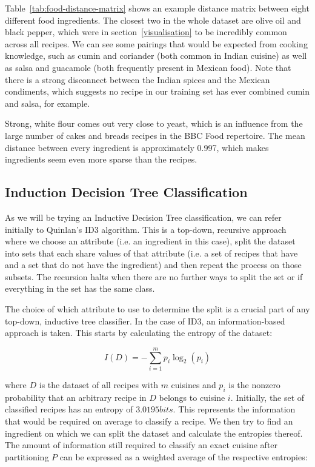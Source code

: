 \documentclass[11pt,a4paper]{article}
\begin{document}
Table~\ref{tab:food-distance-matrix} shows an example distance matrix between eight
different food ingredients. The closest two in the whole dataset are olive oil
and black pepper, which were in section~\ref{visualisation} to be
incredibly common across all recipes.
We can see some pairings that would be expected from cooking knowledge, such as
cumin and coriander (both common in Indian cuisine) as well as salsa and guacamole
(both frequently present in Mexican food). Note that there is a strong disconnect
between the Indian spices and the Mexican condiments, which suggests no recipe
in our training set has ever combined cumin and salsa, for example.

Strong, white flour comes out very close to yeast, which is an influence from the large
number of cakes and breads recipes in the BBC Food repertoire. The mean distance
between every ingredient is approximately 0.997, which makes ingredients seem
even more sparse than the recipes.

\subsection{Induction Decision Tree Classification}
\label{sec:idt-classification}

As we will be trying an Inductive Decision Tree classification, we can refer
initially to Quinlan's ID3 algorithm. \cite{quinlan1986induction} This is a top-down,
recursive approach where we choose an attribute (i.e. an ingredient in this case),
split the dataset into sets that each share values of that attribute (i.e. a
set of recipes that have and a set that do not have the ingredient) and
then repeat the process on those subsets. The recursion halts when there are no
further ways to split the set or if everything in the set has the same class.

The choice of which attribute to use to determine the split is a crucial part of
any top-down, inductive tree classifier. In the case of ID3, an information-based
approach is taken. This starts by calculating the entropy \cite{reza1961introduction}
of the dataset:

\begin{equation}
  I(D)= - \sum_{i=1}^mp_i\log_2(p_i)
\end{equation}

\noindent where $D$ is the dataset of all recipes with $m$ cuisines
and $p_i$ is the nonzero probability
that an arbitrary recipe in $D$ belongs to cuisine $i$. Initially, the set of
classified recipes has an entropy of $3.0195 bits$. This represents the information
that would be required on average to classify a recipe. We then try to find
an ingredient on which we can split the dataset and calculate the entropies thereof.
The amount of information still required to classify an exact cuisine after
partitioning $P$ can be expressed as a weighted average of the respective
entropies:
\end{document}
